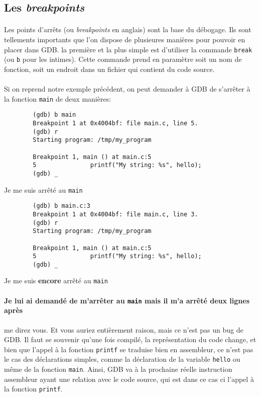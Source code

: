 \subsection{Les \textit{breakpoints}}

\paragraph{} Les points d'arrêts (ou \textit{breakpoints} en anglais) sont la
base du débogage. Ils sont tellements importants que l'on dispose de plusieures
manières pour pouvoir en placer dans GDB. la première et la plus simple est
d'utiliser la commande \texttt{break} (ou \texttt{b} pour les intimes). Cette
commande prend en paramètre soit un nom de fonction, soit un endroit dans un
fichier qui contient du code source.

\paragraph{} Si on reprend notre exemple précédent, on peut demander à GDB de
s'arrêter à la fonction \texttt{main} de deux manières:

\begin{listing}
	\begin{verbatim}
		(gdb) b main
		Breakpoint 1 at 0x4004bf: file main.c, line 5.
		(gdb) r
		Starting program: /tmp/my_program

		Breakpoint 1, main () at main.c:5
		5               printf("My string: %s", hello);
		(gdb) _
	\end{verbatim}
	\caption{Je me suis arrêté au \texttt{main}}
\end{listing}

\begin{listing}
	\begin{verbatim}
		(gdb) b main.c:3
		Breakpoint 1 at 0x4004bf: file main.c, line 3.
		(gdb) r
		Starting program: /tmp/my_program

		Breakpoint 1, main () at main.c:5
		5               printf("My string: %s", hello);
		(gdb) _
	\end{verbatim}
	\caption{Je me suis \textbf{encore} arrêté au \texttt{main}}
\end{listing}

\paragraph{Je lui ai demandé de m'arrêter au \texttt{main} mais il m'a
	arrêté deux lignes après} me direz vous. Et vous auriez entièrement raison,
mais ce n'est pas un bug de GDB. Il faut se souvenir qu'une fois compilé, la
représentation du code change, et bien que l'appel à la fonction
\texttt{printf} se traduise bien en assembleur, ce n'est pas le cas des
déclarations simples, comme la déclaration de la variable \texttt{hello}
ou même de la fonction \texttt{main}. Ainsi, GDB va à la prochaine
réelle instruction assembleur ayant une relation avec le code source, qui est
dans ce cas ci l'appel à la fonction \texttt{printf}.

